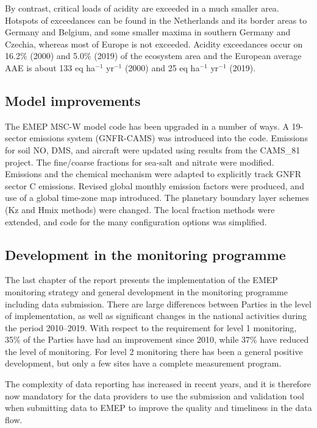 By contrast, critical loads of acidity are exceeded in a much smaller area. Hotspots of
exceedances can be found in the Netherlands and its border areas to Germany and
Belgium, and some smaller maxima in southern Germany and Czechia, whereas most of Europe is not exceeded.
Acidity exceedances occur
on 16.2\% (2000) and 5.0\% (2019) of the ecosystem area and the European average
AAE is about 133 eq ha$^{-1}$ yr$^{-1}$ (2000) and 25 eq ha$^{-1}$ yr$^{-1}$ (2019).




\subsection*{Model improvements} %

The EMEP MSC-W model code has been upgraded in a number of ways. 
A 19-sector emissions system (GNFR-CAMS) was introduced into the code. Emissions for soil NO, DMS, and aircraft were updated using results from the CAMS\_81 project. 
The fine/coarse fractions for sea-salt and nitrate were modified. Emissions and the chemical mechanism were adapted to explicitly track GNFR sector C emissions. Revised global monthly emission factors were produced, and use of a global time-zone map introduced. The planetary boundary layer schemes (Kz and Hmix methods) were changed. The local fraction methods were extended, and code for the many configuration options was simplified. 



\subsection*{Development in the monitoring programme} %
The last chapter of the report presents the implementation of the EMEP monitoring strategy and general development in the monitoring programme including data submission. There are large differences between Parties in the level of implementation, as well as significant changes in the national activities during the period 2010--2019. With respect to the requirement for level 1 monitoring, 35\% of the Parties have had an improvement since 2010, while 37\% have reduced the level of monitoring. For level 2 monitoring there has been a general positive development, but only a few sites have a complete measurement program.

The complexity of data reporting has increased in recent years, and it is therefore now mandatory for the data providers to use the submission and validation tool when submitting data to EMEP to improve the quality and timeliness in the data flow.


